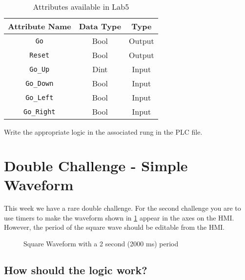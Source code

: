 \begin{table}[h]
\centering
\caption{Attributes available in Lab5}
\label{Table:Lab5_2Attributes}
\begin{tabular}{c c c}
\toprule
Attribute Name & Data Type & Type\\
\midrule
\verb|Go| & Bool & Output \\
\verb|Reset| & Bool & Output \\
\midrule
\verb|Go_Up| & Dint & Input\\
\verb|Go_Down| & Bool & Input\\
\verb|Go_Left| & Bool & Input\\
\verb|Go_Right| & Bool & Input\\
\bottomrule
\end{tabular}
\end{table}

Write the appropriate logic in the associated rung in the PLC file.

\TASignatureSlot



\section{Double Challenge - Simple Waveform}

This week we have a rare double challenge. For the second challenge you are to use timers to make the waveform shown in \figureautorefname \ref{fig:SquareWave} appear in the axes on the HMI. However, the period of the square wave should be editable from the HMI. 

\begin{figure}
\caption{Square Waveform with a 2 second (2000 ms) period}
\label{fig:SquareWave}
\end{figure}

\subsection{How should the logic work?}

